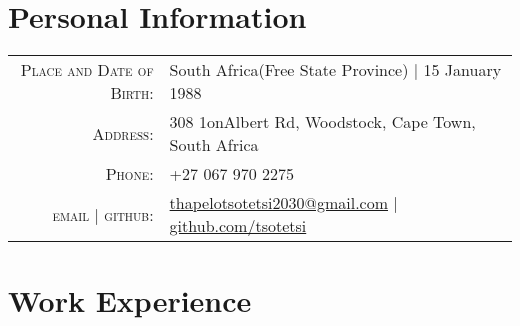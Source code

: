 \documentclass[a4paper,10pt]{article} %
\begin{document}
\pagestyle{empty} %


\par{\bigskip\par} %

\section{Personal Information}

\begin{tabular}{rl}
\textsc{Place and Date of Birth:} & South Africa(Free State Province) | 15 January 1988 \\
\textsc{Address:} & 308 1onAlbert Rd, Woodstock, Cape Town, South Africa \\
\textsc{Phone:} & +27 067 970 2275\\
\textsc{email | github:} & \href{mailto:thapelotsotetsi2030@gmail.com}{thapelotsotetsi2030@gmail.com} | \href{https:github.com/tsotetsi}{github.com/tsotetsi}
\end{tabular}

\section{Work Experience}
\end{document}
